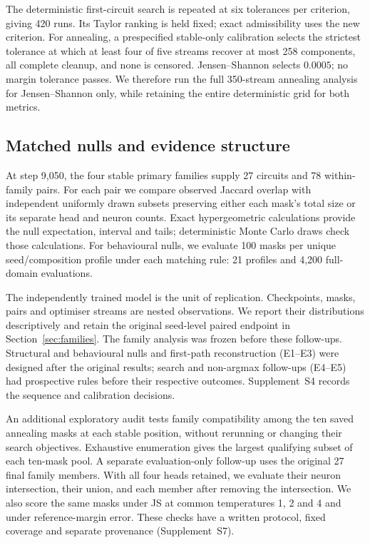The deterministic first-circuit search is repeated at six tolerances per criterion, giving 420 runs. Its Taylor ranking is held fixed; exact admissibility uses the new criterion. For annealing, a prespecified stable-only calibration selects the strictest tolerance at which at least four of five streams recover at most 258 components, all complete cleanup, and none is censored. Jensen--Shannon selects $0.0005$; no margin tolerance passes. We therefore run the full 350-stream annealing analysis for Jensen--Shannon only, while retaining the entire deterministic grid for both metrics.

\subsection{Matched nulls and evidence structure}

At step 9,050, the four stable primary families supply 27 circuits and 78 within-family pairs. For each pair we compare observed Jaccard overlap with independent uniformly drawn subsets preserving either each mask's total size or its separate head and neuron counts. Exact hypergeometric calculations provide the null expectation, interval and tails; deterministic Monte Carlo draws check those calculations. For behavioural nulls, we evaluate 100 masks per unique seed/composition profile under each matching rule: 21 profiles and 4,200 full-domain evaluations.

The independently trained model is the unit of replication. Checkpoints, masks, pairs and optimiser streams are nested observations. We report their distributions descriptively and retain the original seed-level paired endpoint in Section~\ref{sec:families}. The family analysis was frozen before these follow-ups. Structural and behavioural nulls and first-path reconstruction (E1--E3) were designed after the original results; search and non-argmax follow-ups (E4--E5) had prospective rules before their respective outcomes. Supplement~S4 records the sequence and calibration decisions.

An additional exploratory audit tests family compatibility among the ten saved annealing masks at each stable position, without rerunning or changing their search objectives. Exhaustive enumeration gives the largest qualifying subset of each ten-mask pool. A separate evaluation-only follow-up uses the original 27 final family members. With all four heads retained, we evaluate their neuron intersection, their union, and each member after removing the intersection. We also score the same masks under JS at common temperatures 1, 2 and 4 and under reference-margin error. These checks have a written protocol, fixed coverage and separate provenance (Supplement~S7).


